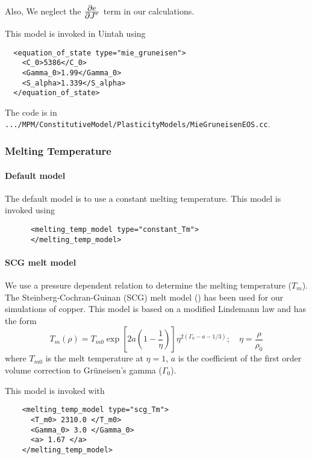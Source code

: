 Also,
\Beq
\Eeq
We neglect the $\Partial{e}{J^e}$ term in our calculations.

This model is invoked in Uintah using
\begin{verbatim}
  <equation_of_state type="mie_gruneisen">
    <C_0>5386</C_0>
    <Gamma_0>1.99</Gamma_0>
    <S_alpha>1.339</S_alpha>
  </equation_of_state>
\end{verbatim}
The code is in \verb|.../MPM/ConstitutiveModel/PlasticityModels/MieGruneisenEOS.cc|.

\subsubsection{Melting Temperature}
  \paragraph{Default model}
  The default model is to use a constant melting temperature.  This model
  is invoked using
  \begin{verbatim}  
      <melting_temp_model type="constant_Tm">
      </melting_temp_model>
  \end{verbatim}  
  
  \paragraph{SCG melt model}
  We use a pressure dependent relation to determine the melting 
  temperature ($T_m$).  The Steinberg-Cochran-Guinan (SCG) melt model 
  (\cite{Steinberg80}) has been used for our simulations of copper.  
  This model is based on a modified Lindemann law and has the form
  \begin{equation} \label{eq:TmSCG}
    T_m(\rho) = T_{m0} \exp\left[2a\left(1-\frac{1}{\eta}\right)\right]
              \eta^{2(\Gamma_0-a-1/3)}; \quad
    \eta = \frac{\rho}{\rho_0}
  \end{equation}
  where $T_{m0}$ is the melt temperature at $\eta = 1$, 
  $a$ is the coefficient of the first order volume correction to 
  Gr{\"u}neisen's gamma ($\Gamma_0$).  

  This model is invoked with
  \begin{verbatim}
    <melting_temp_model type="scg_Tm">
      <T_m0> 2310.0 </T_m0>
      <Gamma_0> 3.0 </Gamma_0>
      <a> 1.67 </a>
    </melting_temp_model>
  \end{verbatim}

